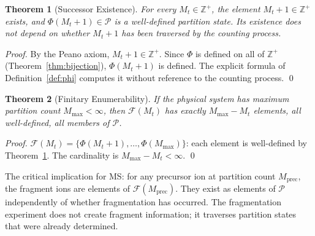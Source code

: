 \documentclass[twocolumn,10pt,a4paper]{article}
\theoremstyle{thmstyle}
\newtheorem{theorem}{Theorem}[section]
\theoremstyle{definition}
\theoremstyle{remark}
\newcommand{\Zp}{\mathbb{Z}^{+}}
\newcommand{\Parts}{\mathcal{P}}
\newcommand{\PhiMap}{\varPhi}
\newcommand{\Mmax}{M_{\max}}
\newcommand{\calF}{\mathcal{F}}
\begin{document}
\begin{theorem}[Successor Existence]
\label{thm:successor}
For every $M_t \in \Zp$, the element $M_t + 1 \in \Zp$ exists, and
$\PhiMap(M_t + 1) \in \Parts$ is a well-defined partition state. Its
existence does not depend on whether $M_t + 1$ has been traversed by
the counting process.
\end{theorem}

\begin{proof}
By the Peano axiom, $M_t + 1 \in \Zp$. Since $\PhiMap$ is defined on
all of $\Zp$ (Theorem~\ref{thm:bijection}), $\PhiMap(M_t + 1)$ is
defined. The explicit formula of Definition~\ref{def:phi} computes it
without reference to the counting process. \qed
\end{proof}

\begin{theorem}[Finitary Enumerability]
\label{thm:finite}
If the physical system has maximum partition count $\Mmax < \infty$,
then $\calF(M_t)$ has exactly $\Mmax - M_t$ elements, all
well-defined, all members of $\Parts$.
\end{theorem}

\begin{proof}
$\calF(M_t) = \{\PhiMap(M_t+1), \ldots, \PhiMap(\Mmax)\}$:
each element is well-defined by Theorem~\ref{thm:successor}.
The cardinality is $\Mmax - M_t < \infty$. \qed
\end{proof}

The critical implication for MS: for any precursor ion at partition
count $M_{\text{prec}}$, the fragment ions are elements of
$\calF(M_{\text{prec}})$. They exist as elements of $\Parts$
independently of whether fragmentation has occurred. The fragmentation
experiment does not create fragment information; it traverses partition
states that were already determined.
\end{document}
